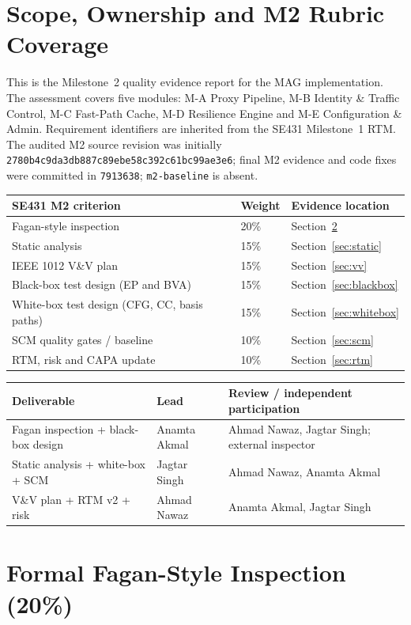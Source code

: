 \documentclass[11pt,a4paper]{article}
\newcommand{\ma}{Ahmad Nawaz}
\newcommand{\mb}{Anamta Akmal}
\newcommand{\mc}{Jagtar Singh}
\begin{document}
\section{Scope, Ownership and M2 Rubric Coverage}
This is the Milestone~2 quality evidence report for the MAG implementation. The assessment covers five modules: M-A Proxy Pipeline, M-B Identity \& Traffic Control, M-C Fast-Path Cache, M-D Resilience Engine and M-E Configuration \& Admin. Requirement identifiers are inherited from the SE431 Milestone~1 RTM. The audited M2 source revision was initially \texttt{2780b4c9da3db887c89ebe58c392c61bc99ae3e6}; final M2 evidence and code fixes were committed in \texttt{7913638}; \texttt{m2-baseline} is absent.
\begin{longtable}{L{6.1cm} L{1.7cm} L{5.4cm}}\toprule
\textbf{SE431 M2 criterion} & \textbf{Weight} & \textbf{Evidence location}\\\midrule\endhead
Fagan-style inspection & 20\% & Section~\ref{sec:inspection}\\
Static analysis & 15\% & Section~\ref{sec:static}\\
IEEE 1012 V\&V plan & 15\% & Section~\ref{sec:vv}\\
Black-box test design (EP and BVA) & 15\% & Section~\ref{sec:blackbox}\\
White-box test design (CFG, CC, basis paths) & 15\% & Section~\ref{sec:whitebox}\\
SCM quality gates / baseline & 10\% & Section~\ref{sec:scm}\\
RTM, risk and CAPA update & 10\% & Section~\ref{sec:rtm}\\\bottomrule
\end{longtable}
\begin{longtable}{L{5.1cm} L{3cm} L{4.9cm}}\toprule
\textbf{Deliverable} & \textbf{Lead} & \textbf{Review / independent participation}\\\midrule\endhead
Fagan inspection + black-box design & \mb & \ma, \mc; external inspector \\
Static analysis + white-box + SCM & \mc & \ma, \mb\\
V\&V plan + RTM v2 + risk & \ma & \mb, \mc\\\bottomrule\end{longtable}

\section{Formal Fagan-Style Inspection (20\%)}\label{sec:inspection}
\end{document}
